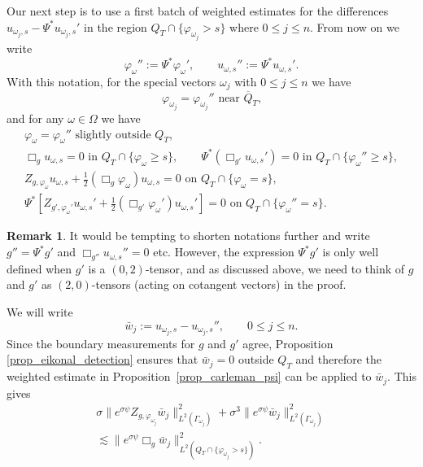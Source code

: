 \documentclass[11pt,letterpaper]{amsart}
\theoremstyle{definition}
\newtheorem{Remark}[Theorem]{Remark}
\numberwithin{equation}{section}
\newcommand{\norm}[1]{\lVert #1 \rVert}         %
\newcommand{\ol}[1]{\overline{#1}}
\begin{document}
Our next step is to use a first batch of weighted estimates for the differences $u_{\omega_j,s} - \Psi^* u_{\omega_j,s}'$ in the region $Q_T \cap \{ \varphi_{\omega_j} > s \}$ where $0 \leq j \leq n$. From now on we write 
\[
\varphi_{\omega}'' := \Psi^* \varphi_{\omega}', \qquad u_{\omega,s}'' := \Psi^* u_{\omega,s}'.
\]
With this notation, for the special vectors $\omega_j$ with $0 \leq j \leq n$ we have 
\[
\text{$\varphi_{\omega_j} = \varphi_{\omega_j}''$ near $\ol{Q}_T$,}
\]
and for any $\omega \in \Omega$ we have 
\begin{gather*}
\text{$\varphi_{\omega} = \varphi_{\omega}''$ slightly outside $Q_T$}, \\
\Box_g u_{\omega,s} = 0 \text{ in $Q_T \cap \{ \varphi_{\omega} \geq s \}$}, \qquad \Psi^*(\Box_{g'} u_{\omega,s}') = 0 \text{ in $Q_T \cap \{ \varphi_{\omega}'' \geq s \}$}, \\
Z_{g,\varphi_{\omega}} u_{\omega,s} + \frac{1}{2} (\Box_g \varphi_{\omega}) u_{\omega,s}  = 0 \text{ on $Q_T \cap \{ \varphi_{\omega} = s \}$}, \\
\Psi^* \left[ Z_{g',\varphi_{\omega}'} u_{\omega,s}'+ \frac{1}{2} (\Box_{g'} \varphi_{\omega}') u_{\omega,s}' \right]  = 0 \text{ on $Q_T \cap \{ \varphi_{\omega}'' = s \}$}.
\end{gather*}

\begin{Remark}
It would be tempting to shorten notations further and write $g'' = \Psi^* g'$ and $\Box_{g''} u_{\omega,s}'' = 0$ etc. However, the expression $\Psi^* g'$ is only well defined when $g'$ is a $(0,2)$-tensor, and as discussed above, we need to think of $g$ and $g'$ as $(2,0)$-tensors (acting on cotangent vectors) in the proof. 
\end{Remark}

We will write 
\[
\bar{w}_j := u_{\omega_j,s} - u_{\omega_j,s}'', \qquad 0 \leq j \leq n.
\]
Since the boundary measurements for $g$ and $g'$ agree, Proposition \ref{prop_eikonal_detection} ensures that $\bar{w}_j = 0$ outside $Q_T$ and therefore the weighted estimate in Proposition~\ref{prop_carleman_psi} can be applied to $\bar{w}_j$. This gives 
\begin{multline} \label{barwj_carleman_estimate}
\sigma \norm{e^{\sigma \psi} Z_{g,\varphi_{\omega_j}} \bar{w}_j}_{L^2(\Gamma_{\omega_j})}^2 + \sigma^3 \norm{e^{\sigma \psi} \bar{w}_j}_{L^2(\Gamma_{\omega_j})}^2  \\
 \lesssim \norm{e^{\sigma \psi} \Box_g \bar{w}_j}_{L^2(Q_T \cap \{ \varphi_{\omega_j} > s \})}^2.
\end{multline}
\end{document}
